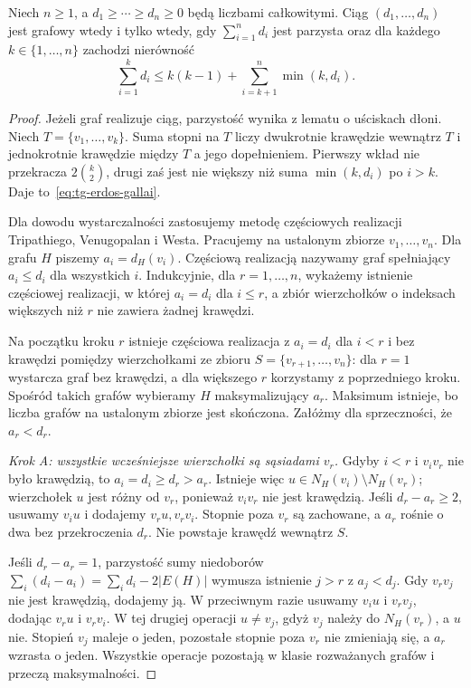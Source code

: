 \begin{twierdzenie}
\label{thm:tg-erdos-gallai}
Niech $n\ge1$, a $d_1\ge\cdots\ge d_n\ge0$ będą liczbami
całkowitymi. Ciąg $(d_1,\ldots,d_n)$ jest grafowy wtedy i tylko
wtedy, gdy $\sum_{i=1}^n d_i$ jest parzysta oraz dla
każdego $k\in\{1,\ldots,n\}$ zachodzi nierówność
\begin{equation}
\label{eq:tg-erdos-gallai}
\sum_{i=1}^k d_i\le k(k-1)+\sum_{i=k+1}^n\min(k,d_i).
\end{equation}
\end{twierdzenie}

\begin{proof}
Jeżeli graf realizuje ciąg, parzystość wynika z lematu
o uściskach dłoni. Niech $T=\{v_1,\ldots,v_k\}$.
Suma stopni na $T$ liczy dwukrotnie krawędzie wewnątrz $T$
i jednokrotnie krawędzie między $T$ a jego dopełnieniem.
Pierwszy wkład nie przekracza $2\binom{k}{2}$, drugi
zaś jest nie większy niż suma $\min(k,d_i)$ po $i>k$.
Daje to~\eqref{eq:tg-erdos-gallai}.

Dla dowodu wystarczalności zastosujemy metodę częściowych
realizacji Tripathiego, Venugopalan i Westa.
Pracujemy na ustalonym zbiorze $v_1,\ldots,v_n$.
Dla grafu $H$ piszemy $a_i=d_H(v_i)$.
Częściową realizacją nazywamy graf spełniający $a_i\le d_i$
dla wszystkich $i$. Indukcyjnie, dla $r=1,\ldots,n$,
wykażemy istnienie częściowej realizacji, w której
$a_i=d_i$ dla $i\le r$, a zbiór wierzchołków o indeksach
większych niż $r$ nie zawiera żadnej krawędzi.

Na początku kroku $r$ istnieje częściowa realizacja
z $a_i=d_i$ dla $i<r$ i bez krawędzi pomiędzy
wierzchołkami ze zbioru $S=\{v_{r+1},\ldots,v_n\}$:
dla $r=1$ wystarcza graf bez krawędzi, a dla większego $r$
korzystamy z poprzedniego kroku. Spośród takich grafów
wybieramy $H$ maksymalizujący $a_r$. Maksimum istnieje,
bo liczba grafów na ustalonym zbiorze jest skończona.
Załóżmy dla sprzeczności, że $a_r<d_r$.

\smallskip
\noindent\textit{Krok A: wszystkie wcześniejsze wierzchołki
są sąsiadami $v_r$.}
Gdyby $i<r$ i $v_iv_r$ nie było krawędzią, to
$a_i=d_i\ge d_r>a_r$. Istnieje więc
$u\in N_H(v_i)\setminus N_H(v_r)$; wierzchołek $u$
jest różny od $v_r$, ponieważ $v_iv_r$ nie jest krawędzią.
Jeśli $d_r-a_r\ge2$, usuwamy $v_iu$ i dodajemy
$v_ru,v_rv_i$. Stopnie poza $v_r$ są zachowane,
a $a_r$ rośnie o dwa bez przekroczenia $d_r$.
Nie powstaje krawędź wewnątrz $S$.

Jeśli $d_r-a_r=1$, parzystość sumy niedoborów
$\sum_i(d_i-a_i)=\sum_i d_i-2|E(H)|$ wymusza
istnienie $j>r$ z $a_j<d_j$. Gdy $v_rv_j$ nie jest
krawędzią, dodajemy ją. W przeciwnym razie
usuwamy $v_iu$ i $v_rv_j$, dodając $v_ru$ i $v_rv_i$.
W tej drugiej operacji $u\ne v_j$, gdyż $v_j$ należy
do $N_H(v_r)$, a $u$ nie. Stopień $v_j$ maleje o jeden,
pozostałe stopnie poza $v_r$ nie zmieniają się,
a $a_r$ wzrasta o jeden. Wszystkie operacje pozostają
w klasie rozważanych grafów i przeczą maksymalności.


\end{proof}

